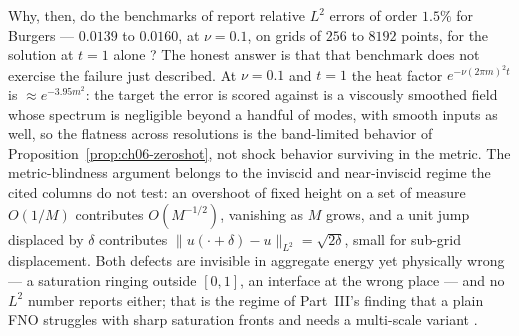 Why, then, do the benchmarks of 
report relative $L^2$ errors of order $1.5\%$ for Burgers --- $0.0139$ to $0.0160$, at
$\nu = 0.1$, on grids of $256$ to $8192$ points, for the solution at $t = 1$ alone
\cite{li2021fourier}? The honest answer is that that benchmark does not exercise the
failure just described. At $\nu = 0.1$ and $t = 1$ the heat factor
$e^{-\nu(2\pi m)^2 t}$ is $\approx e^{-3.95 m^2}$: the target the error is scored
against is a viscously smoothed field whose spectrum is negligible beyond a handful
of modes, with smooth inputs as well, so the flatness across resolutions is the
band-limited behavior of Proposition~\ref{prop:ch06-zeroshot}, not shock behavior
surviving in the metric. The metric-blindness argument belongs to the inviscid and
near-inviscid regime the cited columns do not test: an overshoot of fixed
height on a set of measure $O(1/M)$ contributes $O(M^{-1/2})$, vanishing as $M$
grows, and a unit jump displaced by $\delta$ contributes
$\|u(\cdot+\delta)-u\|_{L^2}=\sqrt{2\delta}$, small for sub-grid displacement.
Both defects are invisible in aggregate energy yet physically wrong --- a
saturation ringing outside $[0,1]$, an interface at the wrong place --- and no
$L^2$ number reports either; that is the regime of Part~III's finding
that a plain FNO struggles with sharp saturation fronts and needs a multi-scale
variant \cite{wen2022ufno}. 

